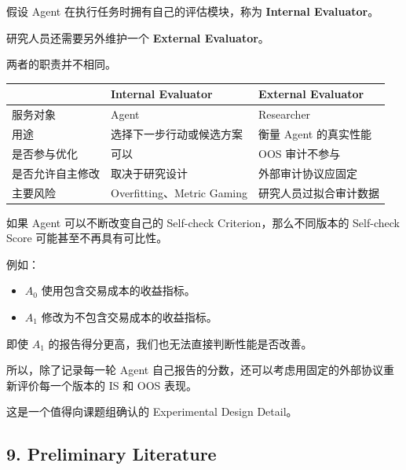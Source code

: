 假设 Agent 在执行任务时拥有自己的评估模块，称为 \textbf{Internal Evaluator}。

研究人员还需要另外维护一个 \textbf{External Evaluator}。


两者的职责并不相同。

\begin{readertable}
\begin{longtable}[]{@{}
  >{\raggedright\arraybackslash}p{}
  >{\raggedright\arraybackslash}p{}
  >{\raggedright\arraybackslash}p{}@{}}
\toprule
& Internal Evaluator & External Evaluator \\
\midrule
\endhead
服务对象 & Agent & Researcher \\
用途 & 选择下一步行动或候选方案 & 衡量 Agent 的真实性能 \\
是否参与优化 & 可以 & OOS 审计不参与 \\
是否允许自主修改 & 取决于研究设计 & 外部审计协议应固定 \\
主要风险 & Overfitting、Metric Gaming & 研究人员过拟合审计数据 \\
\bottomrule
\end{longtable}
\end{readertable}

如果 Agent 可以不断改变自己的 Self-check Criterion，那么不同版本的 Self-check Score 可能甚至不再具有可比性。

例如：

\begin{itemize}
\tightlist
\item
  \(A_0\) 使用包含交易成本的收益指标。
\item
  \(A_1\) 修改为不包含交易成本的收益指标。
\end{itemize}

即使 \(A_1\) 的报告得分更高，我们也无法直接判断性能是否改善。

所以，除了记录每一轮 Agent 自己报告的分数，还可以考虑用固定的外部协议重新评价每一个版本的 IS 和 OOS 表现。

这是一个值得向课题组确认的 Experimental Design Detail。

\hypertarget{part-3-31-0001-preliminary-literature}{%
\subsection{9. Preliminary Literature}\label{part-3-31-0001-preliminary-literature}}

